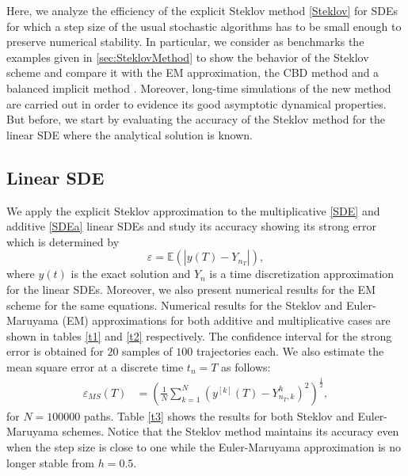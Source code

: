 		Here, we analyze the efficiency of the  explicit Steklov method \eqref{Steklov} for
	SDEs for which a step size of the usual stochastic algorithms has to be  small  enough
	to preserve numerical stability. In particular, we consider as benchmarks the examples
	given in \cref{sec:SteklovMethod} to show the behavior of the Steklov scheme and compare it
	with the EM approximation, the CBD method \cite{Braanka1998} and a 
	balanced implicit method \cite{Schurz2007}. Moreover, long-time simulations of the new method
	are carried out in order to evidence  its good asymptotic dynamical properties.  But
	before, we start by evaluating the accuracy of the Steklov method for the linear SDE
	where the analytical solution is known.
	\subsection{Linear SDE}
		We apply the explicit Steklov approximation to the multiplicative \eqref{SDE} and
		additive \eqref{SDEa} linear SDEs and study its accuracy showing its strong error
		which is determined by
		\begin{equation}\label{eqn:StrongError}
			\varepsilon=\mathbb{E}
			\left(
				|y(T)-Y_{n_T}|
			\right),
		\end{equation}
		where  $y(t)$ is the exact solution  and  $Y_n$ is a time discretization approximation
		for the linear SDEs. Moreover, we also present numerical results for the
		EM scheme  for the same equations. Numerical  results for the Steklov
		and Euler-Maruyama (EM) approximations for both additive and multiplicative cases are
		shown in tables \ref{t1} and \ref{t2} respectively. The confidence interval for the
		strong error is obtained for $20$ samples of $100$ trajectories each. We also
		estimate the mean square error at a discrete time $t_n=T$ as follows:
		\begin{align}\label{eqn:MSEerrort}
			\varepsilon_{MS}(T)
			&=
			\left(
			\frac{1}{N}\sum_{k=1}^{N}
				\left(
					y^{[k]}(T)-Y_{n_T,k}^{h}
				\right)^2
			\right)^{\frac{1}{2}}, 
		\end{align}
		for $N=\num{100000}$ paths. Table \ref{t3} shows the results for both Steklov and
		Euler-Maruyama schemes. Notice that the Steklov method  maintains its accuracy even
		when the step size is close to one while the Euler-Maruyama approximation is no longer
		stable from $h=\num{0.5}$.
